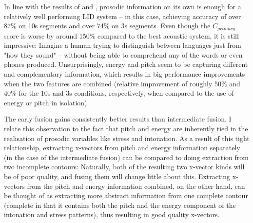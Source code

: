 \documentclass[bsc,frontabs,twoside,singlespacing,parskip,deptreport]{infthesis}
\begin{document}
{{    %
    In line with the results of \citet{Lin_et_al_2005} and \citet{Martinez_et_al_2012}, prosodic information on its own is enough for a relatively well performing LID system -- in this case, achieving accuracy of over 87\% on 10s segments and over 74\% on 3s segments.
    Even though the $C_{primary}$ score is worse by around 150\% compared to the best acoustic system, it is still impressive: Imagine a human trying to distinguish between languages just from "how they sound" -- without being able to comprehend any of the words or even phones produced.
    Unsurprisingly, energy and pitch seem to be capturing different and complementary information, which results in big performance improvements when the two features are combined (relative improvement of roughly 50\% and 40\% for the 10s and 3s conditions, respectively, when compared to the use of energy or pitch in isolation).
    
    The early fusion gains consistently better results than intermediate fusion. I relate this observation to the fact that pitch and energy are inherently tied in the realisation of prosodic variables like stress and intonation. As a result of this tight relationship, extracting x-vectors from pitch and energy information separately (in the case of the intermediate fusion) can be compared to doing extraction from two incomplete contours: Naturally, both of the resulting two x-vector kinds will be of poor quality, and fusing them will change little about this. Extracting x-vectors from the pitch and energy information combined, on the other hand, can be thought of as extracting more abstract information from one complete contour (complete in that it contains both the pitch and the energy component of the intonation and stress patterns), thus resulting in good quality x-vectors.

}}
\end{document}

